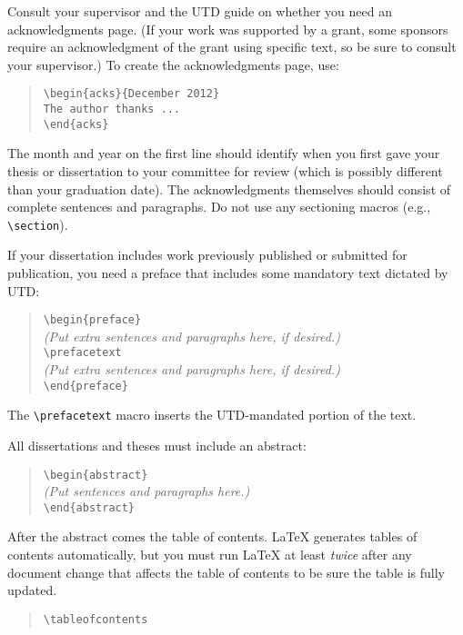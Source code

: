 \documentclass[doublespacing]{utdthesis}
\newenvironment{exampleclasscode}
 {\parindent=1cm\begin{verse}}
 {\end{verse}}
\begin{document}
Consult your supervisor and the UTD guide on whether you need an
acknowledgments page.
(If your work was supported by a grant, some sponsors require an
acknowledgment of the grant using specific text, so be sure to consult your
supervisor.)
To create the acknowledgments page, use:
\begin{exampleclasscode}
\verb|\begin{acks}{December 2012}| \\
\verb|The author thanks ...| \\
\verb|\end{acks}|
\end{exampleclasscode}
The month and year on the first line should identify when you first gave your
thesis or dissertation to your committee for review (which is possibly
different than your graduation date).
The acknowledgments themselves should consist of complete sentences and
paragraphs.
Do not use any sectioning macros (e.g., \verb|\section|).

If your dissertation includes work previously published or submitted for
publication, you need a preface that includes some mandatory text dictated
by UTD:
\begin{exampleclasscode}
\verb|\begin{preface}| \\
\textit{(Put extra sentences and paragraphs here, if desired.)} \\
\verb|\prefacetext| \\
\textit{(Put extra sentences and paragraphs here, if desired.)} \\
\verb|\end{preface}|
\end{exampleclasscode}
The \verb|\prefacetext| macro inserts the UTD-mandated portion of the text.

All dissertations and theses must include an abstract:
\begin{exampleclasscode}
\verb|\begin{abstract}| \\
\textit{(Put sentences and paragraphs here.)} \\
\verb|\end{abstract}|
\end{exampleclasscode}

After the abstract comes the table of contents.
\LaTeX{} generates tables of contents automatically, but you must run \LaTeX{}
at least \emph{twice} after any document change that affects the table of
contents to be sure the table is fully updated.
\begin{exampleclasscode}
\verb|\tableofcontents|
\end{exampleclasscode}
\end{document}
